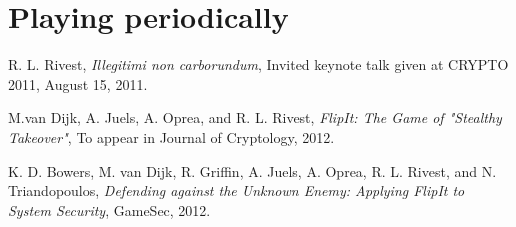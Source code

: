 \section{Playing periodically}

\begin{thebibliography}{9}

  R. L. Rivest,
  \emph{Illegitimi non carborundum},
  Invited keynote talk given at CRYPTO 2011,
  August 15, 2011.

  M.van Dijk, A. Juels, A. Oprea, and R. L. Rivest,
  \emph{FlipIt: The Game of "Stealthy Takeover"},
  To appear in Journal of Cryptology,
  2012.

  K. D. Bowers, M. van Dijk, R. Griffin, A. Juels, A. Oprea, R. L. Rivest, and N. Triandopoulos,
  \emph{Defending against the Unknown Enemy: Applying FlipIt to System Security},
  GameSec,
  2012.

\end{thebibliography}


